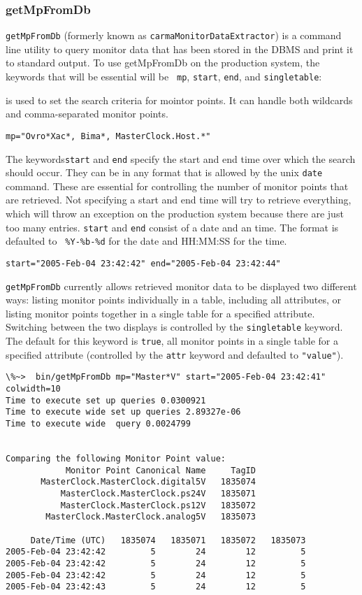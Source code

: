\subsubsection{getMpFromDb}

{\tt getMpFromDb} (formerly known as {\tt carmaMonitorDataExtractor})
is a command line utility to query monitor data that has been stored
in the DBMS and print it to standard output. To use getMpFromDb on the
production system, the keywords that will be essential will be {\tt
mp}, {\tt start}, {\tt end}, and {\tt singletable}:

 is used to set the search criteria for mointor
points.  It can handle both wildcards and comma-separated monitor
points.

{\tt mp="Ovro*Xac*, Bima*, MasterClock.Host.*"}

\noindent The keywords{\tt start} and {\tt end} specify the start and
end time over which the search should occur.  They can be in any
format that is allowed by the unix {\tt date} command.  These are
essential for controlling the number of monitor points that are
retrieved.  Not specifying a start and end time will try to retrieve
everything, which will throw an exception on the production system
because there are just too many entries.  {\tt start} and {\tt end}
consist of a date and an time.  The format is defaulted to {\tt
\%Y-\%b-\%d} for the date and HH:MM:SS for the time.

{\tt start="2005-Feb-04 23:42:42" end="2005-Feb-04 23:42:44"}

{\tt getMpFromDb} currently allows retrieved monitor data to be
displayed two different ways: listing monitor points individually in a
table, including all attributes, or listing monitor points together in
a single table for a specified attribute.  Switching between the two
displays is controlled by the {\tt singletable} keyword.  The default for
this keyword is {\tt true}, all monitor points in a single table for a
specified attribute (controlled by the {\tt attr} keyword and
defaulted to {\tt "value"}). 

\begin{verbatim}
\%~>  bin/getMpFromDb mp="Master*V" start="2005-Feb-04 23:42:41" colwidth=10
Time to execute set up queries 0.0300921
Time to execute wide set up queries 2.89327e-06
Time to execute wide  query 0.0024799


Comparing the following Monitor Point value: 
            Monitor Point Canonical Name     TagID
       MasterClock.MasterClock.digital5V   1835074
           MasterClock.MasterClock.ps24V   1835071
           MasterClock.MasterClock.ps12V   1835072
        MasterClock.MasterClock.analog5V   1835073

     Date/Time (UTC)   1835074   1835071   1835072   1835073
2005-Feb-04 23:42:42         5        24        12         5
2005-Feb-04 23:42:42         5        24        12         5
2005-Feb-04 23:42:42         5        24        12         5
2005-Feb-04 23:42:43         5        24        12         5

\end{verbatim}

